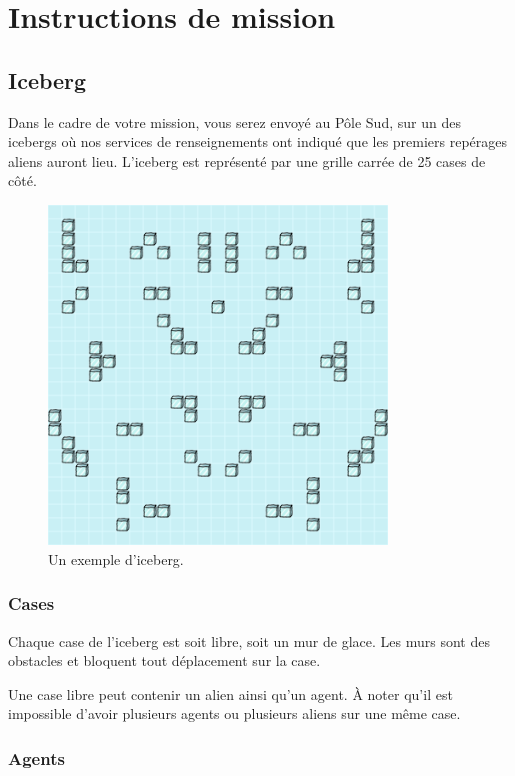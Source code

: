 \section{Instructions de mission}\label{instructions-de-mission}

\subsection{Iceberg}\label{iceberg}

Dans le cadre de votre mission, vous serez envoyé au Pôle Sud, sur un
des icebergs où nos services de renseignements ont indiqué que les
premiers repérages aliens auront lieu. L'iceberg est représenté par une
grille carrée de 25 cases de côté.

\begin{figure}[!h]
    \centering
    \includegraphics[width=9cm]{img/map.png}
    \caption*{Un exemple d'iceberg.}
\end{figure}

\subsubsection{Cases}\label{cases}

Chaque case de l'iceberg est soit libre, soit un mur de glace. Les murs
sont des obstacles et bloquent tout déplacement sur la case.

Une case libre peut contenir un alien ainsi qu'un agent. À noter qu'il
est impossible d'avoir plusieurs agents ou plusieurs aliens sur une même
case.

\subsubsection{Agents}\label{agents}

